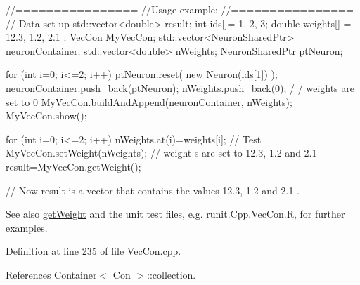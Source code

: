 \begin{DoxyCode}
        //================
        //Usage example:
        //================
        // Data set up
                std::vector<double> result;
                        int ids[]= {1, 2, 3};
                        double weights[] = {12.3, 1.2, 2.1 };
                        VecCon MyVecCon;
                        std::vector<NeuronSharedPtr> neuronContainer;
                        std::vector<double> nWeights;
                        NeuronSharedPtr ptNeuron;

                        for (int i=0; i<=2; i++) {
                        ptNeuron.reset( new Neuron(ids[1]) );
                        neuronContainer.push_back(ptNeuron);
                        nWeights.push_back(0);                                   /
      / weights are set to 0
                        }
                        MyVecCon.buildAndAppend(neuronContainer, nWeights);
                        MyVecCon.show();

                        for (int i=0; i<=2; i++) {
                                nWeights.at(i)=weights[i];
                        }
        // Test
                        MyVecCon.setWeight(nWeights);                    // weight
      s are set to 12.3, 1.2 and 2.1
                        result=MyVecCon.getWeight();

        // Now result is a vector that contains the values 12.3, 1.2 and 2.1 .
\end{DoxyCode}


\begin{DoxySeeAlso}{See also}
\hyperlink{classvec_con_a76f10669494f2247d036ae6a1f296873}{getWeight} and the unit test files, e.g. runit.Cpp.VecCon.R, for further examples. 
\end{DoxySeeAlso}


Definition at line 235 of file VecCon.cpp.



References Container$<$ Con $>$::collection.


